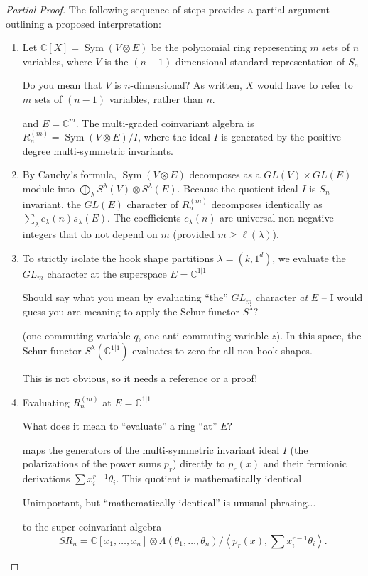 \documentclass[12pt]{article}
\newcommand{\review}[1]{\begin{reviewbox}#1\end{reviewbox}}
\begin{document}
\begin{proof}[Partial Proof]
The following sequence of steps provides a partial argument outlining a proposed interpretation:

\begin{enumerate}
    \item Let $\mathbb{C}[X] = \operatorname{Sym}(V \otimes E)$ be the polynomial ring representing $m$ sets of $n$ variables, where $V$ is the $(n-1)$-dimensional standard representation of $S_n$ \review{Do you mean that $V$ is $n$-dimensional? As written, $X$ would have to refer to $m$ sets of $(n - 1)$ variables, rather than $n$.} and $E = \mathbb{C}^m$. The multi-graded coinvariant algebra is $R_n^{(m)} = \operatorname{Sym}(V \otimes E) / I$, where the ideal $I$ is generated by the positive-degree multi-symmetric invariants.
    
    \item By Cauchy's formula, $\operatorname{Sym}(V \otimes E)$ decomposes as a $GL(V) \times GL(E)$ module into $\bigoplus_{\lambda} S^\lambda(V) \otimes S^\lambda(E)$. Because the quotient ideal $I$ is $S_n$-invariant, the $GL(E)$ character of $R_n^{(m)}$ decomposes identically as $\sum_\lambda c_\lambda(n) s_\lambda(E)$. The coefficients $c_\lambda(n)$ are universal non-negative integers that do not depend on $m$ (provided $m \ge \ell(\lambda)$).
    
    \item To strictly isolate the hook shape partitions $\lambda = (k, 1^d)$, we evaluate the $GL_m$ character at the superspace $E = \mathbb{C}^{1|1}$ \review{Should say what you mean by evaluating ``the'' $GL_m$ character \textit{at} $E$ -- I would guess you are  meaning to apply the Schur functor $S^\lambda$? }(one commuting variable $q$, one anti-commuting variable $z$). In this space, the Schur functor $S^\lambda(\mathbb{C}^{1|1})$ evaluates to zero for all non-hook shapes. \review{This is not obvious, so it needs a reference or a proof!}
    
    \item Evaluating $R_n^{(m)}$ at $E = \mathbb{C}^{1|1}$ \review{What does it mean to ``evaluate'' a ring ``at'' $E$?} maps the generators of the multi-symmetric invariant ideal $I$ (the polarizations of the power sums $p_r$) directly to $p_r(x)$ and their fermionic derivations $\sum x_i^{r-1} \theta_i$. This quotient is mathematically identical \review{Unimportant, but ``mathematically identical'' is unusual phrasing... }to the super-coinvariant algebra 
    \[
    SR_n = \mathbb{C}[x_1, \dots, x_n] \otimes \Lambda(\theta_1, \dots, \theta_n) / \left\langle p_r(x), \sum x_i^{r-1} \theta_i \right\rangle.
    \]
    

\end{enumerate}
\end{proof}
\end{document}
